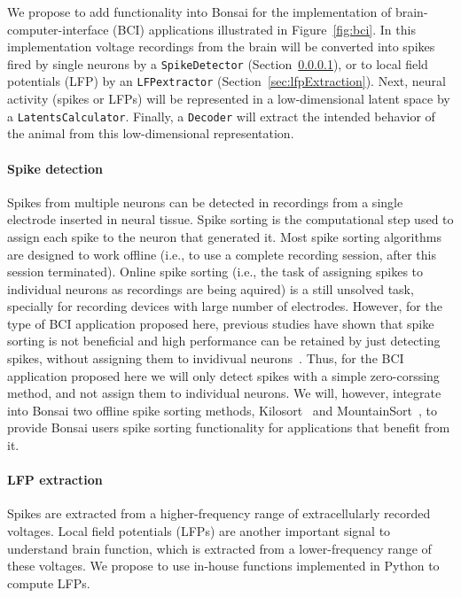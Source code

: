 We propose to add functionality into Bonsai for the implementation of
brain-computer-interface (BCI) applications illustrated in Figure~\ref{fig:bci}. In
this implementation voltage recordings from the brain will be converted into
spikes fired by single neurons by a \texttt{SpikeDetector}
(Section~\ref{sec:spikeDetection}), or to local field potentials (LFP) by an
\texttt{LFPextractor} (Section~\ref{sec:lfpExtraction}). Next, neural activity
(spikes or LFPs) will be represented in a low-dimensional latent space by a
\texttt{LatentsCalculator}. Finally, a \texttt{Decoder} will extract the
intended behavior of the animal from this low-dimensional representation.

\paragraph{Spike detection}
\label{sec:spikeDetection}

Spikes from multiple neurons can be detected in recordings from a single
electrode inserted in neural tissue. Spike sorting is the computational step
used to assign each spike to the neuron that generated it. Most spike sorting
algorithms are designed to work offline (i.e., to use a complete recording
session, after this session terminated). Online spike sorting (i.e., the task
of assigning spikes to individual neurons as recordings are being aquired) is a
still unsolved task, specially for recording devices with large number of
electrodes.
%
However, for the type of BCI application proposed here, previous studies have
shown that spike sorting is not beneficial and high performance can be retained
by just detecting spikes, without assigning them to invidivual
neurons~\citep{trautmannEtAl19,todorovaEtAl14}. Thus, for the BCI application
proposed here we will only detect spikes with a simple zero-corssing method,
and not assign them to individual neurons.  We will, however, integrate into
Bonsai two offline spike sorting methods, Kilosort~\citep[][written in Matlab]{pachitariuEtAl16} and MountainSort~\citep[][written in
Python]{chungEtAl17}, to provide Bonsai users spike sorting functionality for
applications that benefit from it.

\paragraph{LFP extraction}
\label{sec:lfpExtractor}

Spikes are extracted from a higher-frequency range of extracellularly recorded
voltages. Local field potentials (LFPs) 
are another important signal to understand brain function, which is extracted
from a lower-frequency range of these voltages. We propose to use in-house
functions implemented in Python to compute LFPs.

